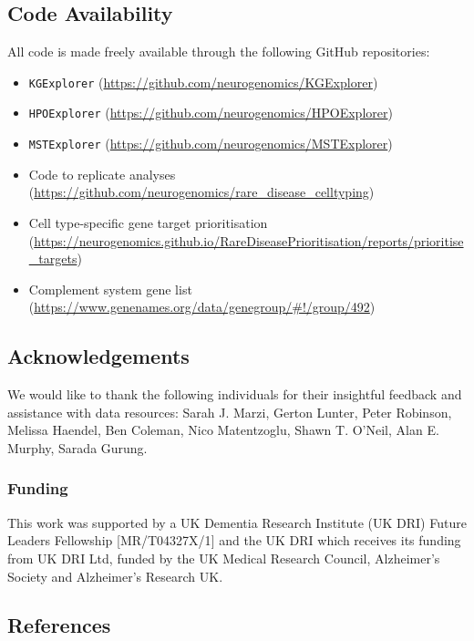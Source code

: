 \documentclass[
]{article}
\providecommand{\tightlist}{%
  \setlength{\itemsep}{0pt}\setlength{\parskip}{0pt}}\usepackage{longtable,booktabs,array}
\begin{document}
\subsection{Code Availability}\label{code-availability}

All code is made freely available through the following GitHub
repositories:

\begin{itemize}
\tightlist
\item
  \texttt{KGExplorer}
  (\url{https://github.com/neurogenomics/KGExplorer})
\item
  \texttt{HPOExplorer}
  (\url{https://github.com/neurogenomics/HPOExplorer})
\item
  \texttt{MSTExplorer}
  (\url{https://github.com/neurogenomics/MSTExplorer})
\item
  Code to replicate analyses
  (\url{https://github.com/neurogenomics/rare_disease_celltyping})
\item
  Cell type-specific gene target prioritisation
  (\url{https://neurogenomics.github.io/RareDiseasePrioritisation/reports/prioritise_targets})
\item
  Complement system gene list
  (\url{https://www.genenames.org/data/genegroup/\#!/group/492})
\end{itemize}

\subsection{Acknowledgements}\label{acknowledgements}

We would like to thank the following individuals for their insightful
feedback and assistance with data resources: Sarah J. Marzi, Gerton
Lunter, Peter Robinson, Melissa Haendel, Ben Coleman, Nico Matentzoglu,
Shawn T. O'Neil, Alan E. Murphy, Sarada Gurung.

\subsubsection{Funding}\label{funding}

This work was supported by a UK Dementia Research Institute (UK DRI)
Future Leaders Fellowship {[}MR/T04327X/1{]} and the UK DRI which
receives its funding from UK DRI Ltd, funded by the UK Medical Research
Council, Alzheimer's Society and Alzheimer's Research UK.

\subsection*{References}\label{references}
\end{document}
